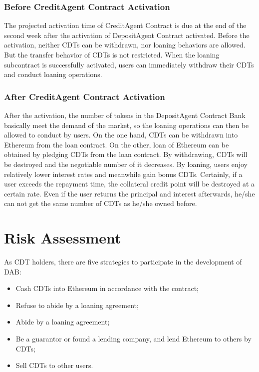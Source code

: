 \documentclass[a4paper, 10pt, conference]{ieeeconf} %
\begin{document}
\subsubsection{Before CreditAgent Contract Activation}
The projected activation time of CreditAgent Contract is due at the end of the second week after the activation of DepositAgent Contract activated. Before the activation, neither CDTs can be withdrawn, nor loaning behaviors are allowed. But the transfer behavior of CDTs is not restricted. When the loaning subcontract is successfully activated, users can immediately withdraw their CDTs and conduct loaning operations.
\subsubsection{After CreditAgent Contract Activation}
After the activation, the number of tokens in the DepositAgent Contract Bank basically meet the demand of the market, so the loaning operations can then be allowed to conduct by users. On the one hand, CDTs can be withdrawn into Ethereum from the loan contract. On the other, loan of Ethereum can be obtained by pledging CDTs from the loan contract. By withdrawing, CDTs will be destroyed and the negotiable number of it decreases. By loaning, users enjoy relatively lower interest rates and meanwhile gain bonus CDTs. Certainly, if a user exceeds the repayment time, the collateral credit point will be destroyed at a certain rate. Even if the user returns the principal and interest afterwards, he/she can not get the same number of CDTs as he/she owned before.

\section{Risk Assessment}
As CDT holders, there are five strategies to participate in the development of DAB:

\begin{itemize}
   \item Cash CDTs into Ethereum in accordance with the contract;
   \item Refuse to abide by a loaning agreement;
   \item Abide by a loaning agreement;
   \item Be a guarantor or found a lending company, and lend Ethereum to others by CDTs;
   \item Sell CDTs to other users.
\end{itemize}
\end{document}

